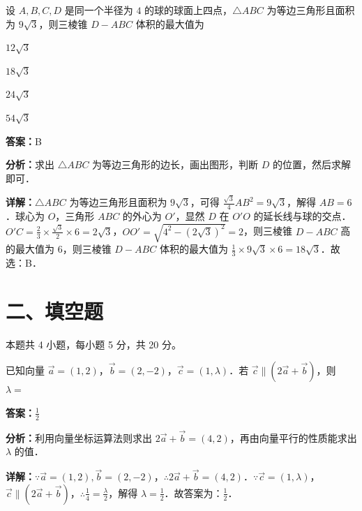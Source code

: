 \begin{question}[points=5]
设 $A,B,C,D$ 是同一个半径为 $4$ 的球的球面上四点，$\triangle ABC$ 为等边三角形且面积为 $9\sqrt{3}$，则三棱锥 $D-ABC$ 体积的最大值为
\begin{choices}
  \item $12\sqrt{3}$
  \item $18\sqrt{3}$
  \item $24\sqrt{3}$
  \item $54\sqrt{3}$
\end{choices}
\begin{solution}
\textbf{答案：}B

\textbf{分析：}求出 $\triangle ABC$ 为等边三角形的边长，画出图形，判断 $D$ 的位置，然后求解即可．

\textbf{详解：}$\triangle ABC$ 为等边三角形且面积为 $9\sqrt{3}$，可得 $\frac{\sqrt{3}}{4}AB^2 = 9\sqrt{3}$，解得 $AB=6$．球心为 $O$，三角形 $ABC$ 的外心为 $O'$，显然 $D$ 在 $O'O$ 的延长线与球的交点．$O'C = \frac{2}{3}\times \frac{\sqrt{3}}{2}\times 6 = 2\sqrt{3}$，$OO' = \sqrt{4^2-(2\sqrt{3})^2}=2$，则三棱锥 $D-ABC$ 高的最大值为 $6$，则三棱锥 $D-ABC$ 体积的最大值为 $\frac{1}{3}\times 9\sqrt{3}\times 6 = 18\sqrt{3}$．故选：B．
\end{solution}
\end{question}

\section*{二、填空题}
本题共 4 小题，每小题 5 分，共 20 分。

\begin{question}[points=5]
已知向量 $\overrightarrow{a}=(1,2)$，$\overrightarrow{b}=(2,-2)$，$\overrightarrow{c}=(1,\lambda)$．若 $\overrightarrow{c}\parallel(2\overrightarrow{a}+\overrightarrow{b})$，则 $\lambda=$
\fillin[{$\frac{1}{2}$}]
\begin{solution}
\textbf{答案：}$\frac{1}{2}$

\textbf{分析：}利用向量坐标运算法则求出 $2\overrightarrow{a}+\overrightarrow{b}=(4,2)$，再由向量平行的性质能求出 $\lambda$ 的值．

\textbf{详解：}$\because \overrightarrow{a}=(1,2),\overrightarrow{b}=(2,-2)$，$\therefore 2\overrightarrow{a}+\overrightarrow{b}=(4,2)$．$\because \overrightarrow{c}=(1,\lambda)$，$\overrightarrow{c}\parallel(2\overrightarrow{a}+\overrightarrow{b})$，$\therefore \frac{1}{4} = \frac{\lambda}{2}$，解得 $\lambda=\frac{1}{2}$．故答案为：$\frac{1}{2}$．
\end{solution}
\end{question}

